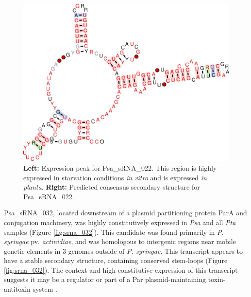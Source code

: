 \begin{figure}[H]
\begin{minipage}{0.49\textwidth}
\includegraphics[scale=0.8]{psa/psa_ncRNA/sRNA_022_structure.png}
    \caption[Expression and predicted consensus secondary structure of Psa\_sRNA\_022]{\textbf{Left:} Expression peak for Psa\_sRNA\_022. This region is highly expressed in starvation conditions \textit{in vitro} and is expressed \textit{in planta}. \textbf{Right:} Predicted consensus secondary structure for Psa\_sRNA\_022.}
    \label{fig:srna_022}
    \end{minipage}
\end{figure}

Psa\_sRNA\_032, located downstream of a plasmid partitioning protein ParA and conjugation machinery, was highly constitutively expressed in \textit{Psa} and all \textit{Pta} samples (Figure \ref{fig:srna_032}). This candidate was found primarily in \textit{P. syringae} pv. \textit{actinidiae}, and was homologous to intergenic regions near mobile genetic elements in 3 genomes outside of \textit{P. syringae}. This transcript appears to have a stable secondary structure, containing conserved stem-loops (Figure \ref{fig:srna_032}). The context and high constitutive expression of this transcript suggests it may be a regulator or part of a Par plasmid-maintaining toxin-antitoxin system \citep{Muthuramalingam2019-uy}.


